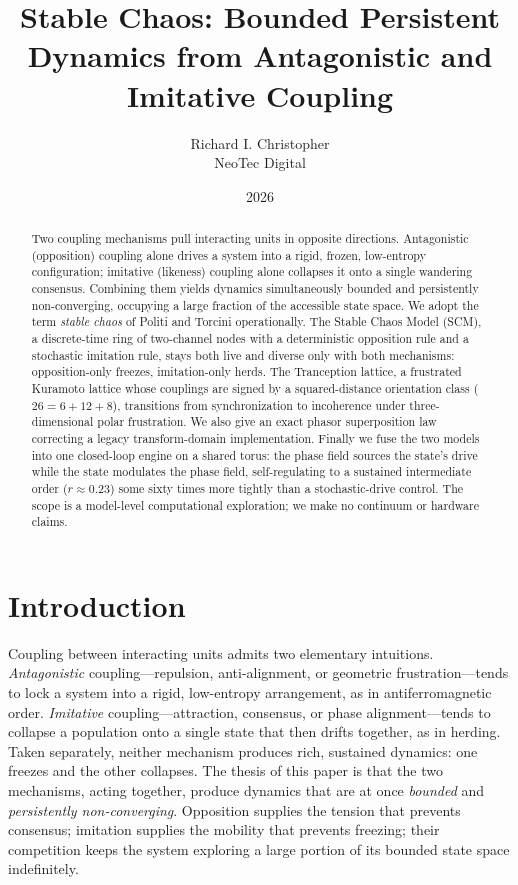 \documentclass[11pt]{article}
\title{Stable Chaos: Bounded Persistent Dynamics from Antagonistic and Imitative Coupling}
\author{Richard I. Christopher\\ \normalsize NeoTec Digital}
\date{2026}
\begin{document}
\maketitle

\begin{abstract}
Two coupling mechanisms pull interacting units in opposite directions. Antagonistic (opposition) coupling alone
drives a system into a rigid, frozen, low-entropy configuration; imitative (likeness) coupling alone collapses it
onto a single wandering consensus. Combining them yields dynamics simultaneously bounded and persistently
non-converging, occupying a large fraction of the accessible state space. We adopt the term \emph{stable chaos} of
Politi and Torcini operationally. The Stable Chaos Model (SCM), a discrete-time ring of two-channel nodes with a
deterministic opposition rule and a stochastic imitation rule, stays both live and diverse only with both mechanisms:
opposition-only freezes, imitation-only herds. The Tranception lattice, a frustrated Kuramoto lattice whose couplings
are signed by a squared-distance orientation class ($26=6+12+8$), transitions from synchronization to incoherence
under three-dimensional polar frustration. We also give an exact phasor superposition law correcting a legacy
transform-domain implementation. Finally we fuse the two models into one closed-loop engine on a shared torus: the
phase field sources the state's drive while the state modulates the phase field, self-regulating to a sustained
intermediate order ($r\approx0.23$) some sixty times more tightly than a stochastic-drive control. The scope is a
model-level computational exploration; we make no continuum or hardware claims.
\end{abstract}

\section{Introduction}
\label{sec:intro}

Coupling between interacting units admits two elementary intuitions. \emph{Antagonistic} coupling---repulsion,
anti-alignment, or geometric frustration---tends to lock a system into a rigid, low-entropy arrangement, as in
antiferromagnetic order. \emph{Imitative} coupling---attraction, consensus, or phase alignment---tends to collapse
a population onto a single state that then drifts together, as in herding. Taken separately, neither mechanism
produces rich, sustained dynamics: one freezes and the other collapses. The thesis of this paper is that the two
mechanisms, acting together, produce dynamics that are at once \emph{bounded} and \emph{persistently
non-converging}. Opposition supplies the tension that prevents consensus; imitation supplies the mobility that
prevents freezing; their competition keeps the system exploring a large portion of its bounded state space
indefinitely.
\end{document}

